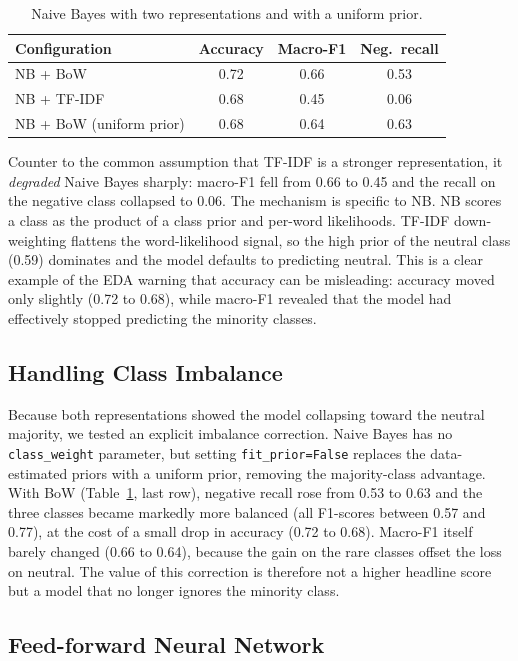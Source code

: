 \begin{table}[t]
\centering
\caption{Naive Bayes with two representations and with a uniform prior.}
\label{tab:nb-rep}
\begin{tabular}{lccc}
\toprule
Configuration & Accuracy & Macro-F1 & Neg.\ recall \\
\midrule
NB + BoW                & 0.72 & 0.66 & 0.53 \\
NB + TF-IDF             & 0.68 & 0.45 & 0.06 \\
NB + BoW (uniform prior) & 0.68 & 0.64 & 0.63 \\
\bottomrule
\end{tabular}
\end{table}

Counter to the common assumption that TF-IDF is a stronger
representation, it \emph{degraded} Naive Bayes sharply: macro-F1 fell
from 0.66 to 0.45 and the recall on the negative class collapsed to
0.06. The mechanism is specific to NB. NB scores a class as the product
of a class prior and per-word likelihoods. TF-IDF down-weighting
flattens the word-likelihood signal, so the high prior of the neutral
class (0.59) dominates and the model defaults to predicting neutral.
This is a clear example of the EDA warning that accuracy can be
misleading: accuracy moved only slightly (0.72 to 0.68), while macro-F1
revealed that the model had effectively stopped predicting the minority
classes.

\subsection{Handling Class Imbalance}

Because both representations showed the model collapsing toward the
neutral majority, we tested an explicit imbalance correction. Naive
Bayes has no \texttt{class\_weight} parameter, but setting
\texttt{fit\_prior=False} replaces the data-estimated priors with a
uniform prior, removing the majority-class advantage. With BoW
(Table~\ref{tab:nb-rep}, last row), negative recall rose from 0.53 to
0.63 and the three classes became markedly more balanced
(all F1-scores between 0.57 and 0.77), at the cost of a small drop in
accuracy (0.72 to 0.68). Macro-F1 itself barely changed (0.66 to 0.64),
because the gain on the rare classes offset the loss on neutral. The
value of this correction is therefore not a higher headline score but a
model that no longer ignores the minority class.

\subsection{Feed-forward Neural Network}

